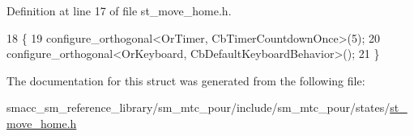 Definition at line 17 of file st\+\_\+move\+\_\+home.\+h.


\begin{DoxyCode}
18     \{
19         configure\_orthogonal<OrTimer,  CbTimerCountdownOnce>(5);    
20         configure\_orthogonal<OrKeyboard, CbDefaultKeyboardBehavior>();
21     \}
\end{DoxyCode}


The documentation for this struct was generated from the following file\+:\begin{DoxyCompactItemize}
\item 
smacc\+\_\+sm\+\_\+reference\+\_\+library/sm\+\_\+mtc\+\_\+pour/include/sm\+\_\+mtc\+\_\+pour/states/\hyperlink{st__move__home_8h}{st\+\_\+move\+\_\+home.\+h}\end{DoxyCompactItemize}
